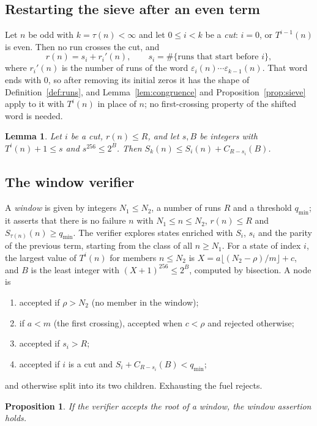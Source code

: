 \documentclass[11pt]{amsart}
\newtheorem{lemma}[theorem]{Lemma}
\newtheorem{proposition}[theorem]{Proposition}
\theoremstyle{definition}
\theoremstyle{remark}
\begin{document}
\subsection{Restarting the sieve after an even term}
Let $n$ be odd with $k=\tau(n)<\infty$ and let $0\le i<k$ be a \emph{cut}: $i=0$, or $T^{i-1}(n)$ is even. Then no run crosses the cut, and
\[
r(n)=s_i+r_i'(n),\qquad s_i=\#\{\text{runs that start before } i\},
\]
where $r_i'(n)$ is the number of runs of the word $\varepsilon_i(n)\cdots\varepsilon_{k-1}(n)$. That word ends with $0$, so after removing its initial zeros it has the shape of Definition~\ref{def:runs}, and Lemma~\ref{lem:congruence} and Proposition~\ref{prop:sieve} apply to it with $T^{i}(n)$ in place of $n$; no first-crossing property of the shifted word is needed.

\begin{lemma}\label{lem:restart}
Let $i$ be a cut, $r(n)\le R$, and let $s,B$ be integers with $T^{i}(n)+1\le s$ and $s^{256}\le2^{B}$. Then $S_k(n)\le S_i(n)+C_{R-s_i}(B)$.
\end{lemma}

\subsection{The window verifier}
A \emph{window} is given by integers $N_1\le N_2$, a number of runs $R$ and a threshold $q_{\min}$; it asserts that there is no failure $n$ with $N_1\le n\le N_2$, $r(n)\le R$ and $S_{\tau(n)}(n)\ge q_{\min}$. The verifier explores states enriched with $S_i$, $s_i$ and the parity of the previous term, starting from the class of all $n\ge N_1$. For a state of index $i$, the largest value of $T^{i}(n)$ for members $n\le N_2$ is $X=a\lfloor(N_2-\rho)/m\rfloor+c$, and $B$ is the least integer with $(X+1)^{256}\le2^{B}$, computed by bisection. A node is
\begin{enumerate}
\item accepted if $\rho>N_2$ (no member in the window);
\item if $a<m$ (the first crossing), accepted when $c<\rho$ and rejected otherwise;
\item accepted if $s_i>R$;
\item accepted if $i$ is a cut and $S_i+C_{R-s_i}(B)<q_{\min}$;
\end{enumerate}
and otherwise split into its two children. Exhausting the fuel rejects.

\begin{proposition}\label{prop:window}
If the verifier accepts the root of a window, the window assertion holds.
\end{proposition}
\end{document}
